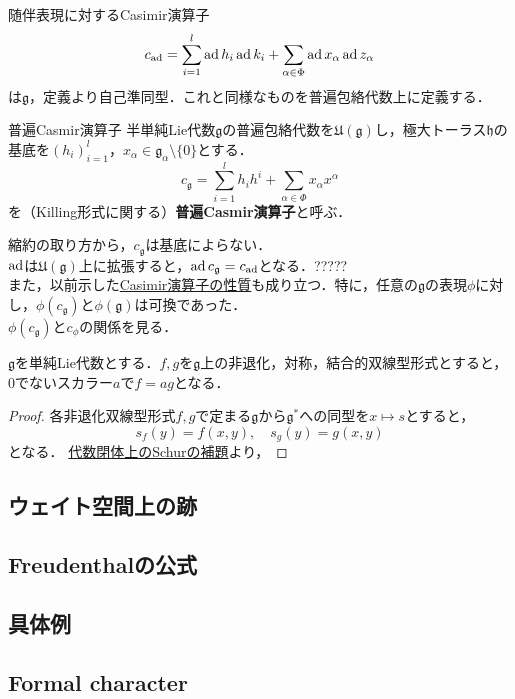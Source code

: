 \documentclass[rep_main]{subfiles}
\begin{document}
随伴表現に対するCasimir演算子
\begin{equation}
	c_{\operatorname{ad}} = \sum_{i=1}^l \operatorname{ad} h_i\operatorname{ad} k_i + \sum_{\alpha \in \Phi} \operatorname{ad} x_\alpha\operatorname{ad} z_\alpha
\end{equation}
は$\mathfrak{g}$，定義より自己準同型．これと同様なものを普遍包絡代数上に定義する．
\begin{mydef}[label=def:univ-Casmir-op]{普遍Casmir演算子}
	半単純Lie代数$\mathfrak{g}$の普遍包絡代数を$\mathfrak{U}(\mathfrak{g})$し，極大トーラス$\mathfrak{h}$の基底を$(h_i)_{i=1}^l$，$x_\alpha \in \mathfrak{g}_\alpha \setminus \{0\}$とする．
	\begin{equation}
		c_\mathfrak{g} = \sum_{i=1}^l h_ih^i + \sum_{\alpha \in \Phi} x_\alpha x^\alpha
	\end{equation}
	を（Killing形式に関する）\textbf{普遍Casmir演算子}と呼ぶ．
\end{mydef}
縮約の取り方から，$c_\mathfrak{g}$は基底によらない．\\
$\operatorname{ad}$は$\mathfrak{U}(\mathfrak{g})$上に拡張すると，$\operatorname{ad} c_\mathfrak{g} = c_{\operatorname{ad}}$となる．?????\\
また，以前示した\hyperref[prop:Casimir-basic]{Casimir演算子の性質}も成り立つ．特に，任意の$\mathfrak{g}$の表現$\phi$に対し，$\phi(c_\mathfrak{g})$と$\phi(\mathfrak{g})$は可換であった．\\
$\phi(c_\mathfrak{g})$と$c_\phi$の関係を見る．
\begin{mylem}[label=lem:]{}
	$\mathfrak{g}$を単純Lie代数とする．$f, g$を$\mathfrak{g}$上の非退化，対称，結合的双線型形式とすると，$0$でないスカラー$a$で$f = ag$となる．
\end{mylem}
\begin{proof}
	各非退化双線型形式$f, g$で定まる$\mathfrak{g}$から$\mathfrak{g}^*$への同型を$x \mapsto s$とすると，
	\begin{equation}
		s_f(y) = f(x, y),\quad  s_g(y) = g(x, y)
	\end{equation}
	となる．
	\hyperref[col:Schur-closed]{代数閉体上のSchurの補題}より，
\end{proof}

\begin{mytheo}[label=thm:]{}
\end{mytheo}





\subsection{ウェイト空間上の跡}
\subsection{Freudenthalの公式}
\subsection{具体例}
\subsection{Formal character}
\end{document}
